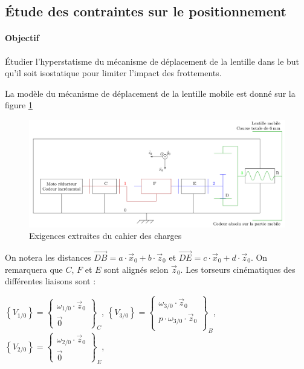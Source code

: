 \subsection{Étude des contraintes sur le positionnement}

\paragraph{Objectif}

Étudier l'hyperstatisme du mécanisme de déplacement de la lentille dans le but qu'il soit isostatique pour limiter l'impact des frottements.

La modèle du mécanisme de déplacement de la lentille mobile est donné sur la figure \ref{img08}

\begin{figure}[!h]
\centering\includegraphics[width=0.9\linewidth]{img/figure_08}
 \caption{Exigences extraites du cahier des charges}
 \label{img08}
\end{figure}

On notera les distances $\overrightarrow{DB}=a\cdot\vec{x}_0+b\cdot\vec{z}_0$ et $\overrightarrow{DE}=c\cdot\vec{x}_0+d\cdot\vec{z}_0$. On remarquera que $C$, $F$ et $E$ sont alignés selon $\vec{z}_0$. Les torseurs cinématiques des différentes liaisons
sont :

$\left\{V_{1/0}\right\}=\left\{\begin{array}{c}
 \omega_{1/0}\cdot\vec{z}_0 \\
 \vec{0} 
 \end{array}\right\}_C$,
$\left\{V_{3/0}\right\}=\left\{\begin{array}{c}
 \omega_{3/0}\cdot\vec{z}_0 \\
 p\cdot\omega_{3/0}\cdot\vec{z}_0 \\
 \end{array}\right\}_B$,
 $\left\{V_{2/0}\right\}=\left\{\begin{array}{c}
 \omega_{2/0}\cdot\vec{z}_0 \\
 \vec{0} 
 \end{array}\right\}_E$,


